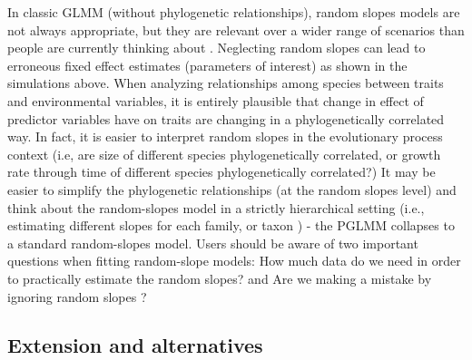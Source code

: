 \documentclass[12pt]{article}
\begin{document}
In classic GLMM (without phylogenetic relationships), random slopes models are not always appropriate, but they are relevant over a wider range of scenarios than people are currently thinking about \cite{schielzeth2008conclusions, cleasby2015quantifying,ord2010adaptation}.
Neglecting random slopes can lead to erroneous fixed effect estimates \citep{schielzeth2008conclusions} (parameters of interest) as shown in the simulations above. 
When analyzing relationships among species between traits and environmental variables, it is entirely plausible that change in effect of predictor variables have on traits are changing in a phylogenetically correlated way.
In fact, it is easier to interpret random slopes in the evolutionary process context (i.e, are size of different species phylogenetically correlated, or growth rate through time of different species phylogenetically correlated?)
It may be easier to simplify the phylogenetic relationships (at the random slopes level) and think about the random-slopes model in a strictly hierarchical setting (i.e., estimating different slopes for each family, or taxon \citep{bunnefeld2012island}) - the PGLMM collapses to a standard random-slopes model. 
Users should be aware of two important questions when fitting random-slope models: How much data do we need in order to practically estimate the random slopes? and Are we making a mistake by ignoring random slopes \citep{schielzeth2008conclusions}? 


\subsection{Extension and alternatives}
\end{document}
